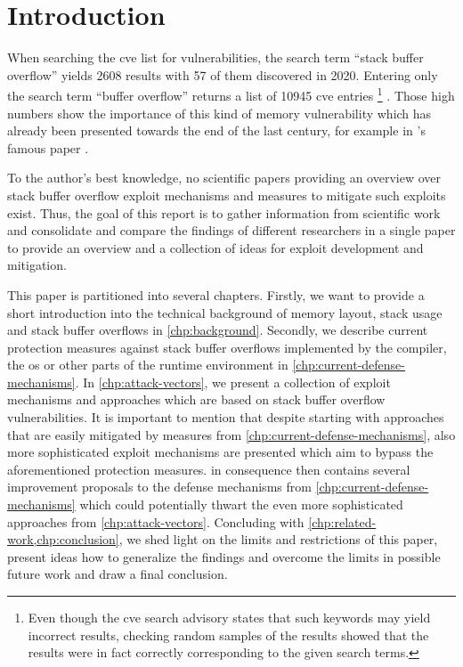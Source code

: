 \chapter{Introduction}
\label{chp:introduction}

When searching the \gls{cve} list \cite{MITRECorporation2020} for vulnerabilities, the search term ``stack buffer overflow'' yields 2608 results with 57 of them discovered in 2020.
Entering only the search term ``buffer overflow'' returns a list of 10945 \gls{cve} entries%
	\footnote{Even though the \gls{cve} search advisory states that such keywords may yield incorrect results, checking random samples of the results showed that the results were in fact correctly corresponding to the given search terms.}%
.
Those high numbers show the importance of this kind of memory vulnerability which has already been presented towards the end of the last century, for example in \citeauthor{AlephOne1996}'s famous paper  \cite{AlephOne1996}.

To the author's best knowledge, no scientific papers providing an overview over stack buffer overflow exploit mechanisms and measures to mitigate such exploits exist.
Thus, the goal of this report is to gather information from scientific work and consolidate and compare the findings of different researchers in a single paper to provide an overview and a collection of ideas for exploit development and mitigation.

This paper is partitioned into several chapters.
Firstly, we want to provide a short introduction into the technical background of memory layout, stack usage and stack buffer overflows in \cref{chp:background}.
Secondly, we describe current protection measures against stack buffer overflows implemented by the compiler, the \gls{os} or other parts of the runtime environment in \cref{chp:current-defense-mechanisms}.
In \cref{chp:attack-vectors}, we present a collection of exploit mechanisms and approaches which are based on stack buffer overflow vulnerabilities.
It is important to mention that despite starting with approaches that are easily mitigated by measures from \cref{chp:current-defense-mechanisms}, also more sophisticated exploit mechanisms are presented which aim to bypass the aforementioned protection measures.
 in consequence then contains several improvement proposals to the defense mechanisms from \cref{chp:current-defense-mechanisms} which could potentially thwart the even more sophisticated approaches from \cref{chp:attack-vectors}.
Concluding with \cref{chp:related-work,chp:conclusion}, we shed light on the limits and restrictions of this paper, present ideas how to generalize the findings and overcome the limits in possible future work and draw a final conclusion.

